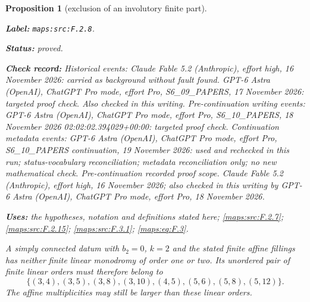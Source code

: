 \documentclass[11pt,a4paper]{article}
\newtheorem{proposition}[proposition]{Proposition}
\theoremstyle{definition}
\newcommand{\StatementRecord}[4]{\par\smallskip\begingroup\upshape\raggedright\noindent\textbf{Label:} \nolinkurl{#1}.\par\noindent\textbf{Status:} #2.\par\noindent\textbf{Check record:} #3.\par\noindent\textbf{Uses:} #4.\par\endgroup\smallskip}
\begin{document}
\begin{proposition}[exclusion of an involutory finite part]\label{maps:src:F.2.8}
\StatementRecord{maps:src:F.2.8}{proved}{Historical events: Claude Fable 5.2 (Anthropic), effort high, 16 November 2026: carried as background without fault found. GPT-6 Astra (OpenAI), ChatGPT Pro mode, effort Pro, S6\_09\_PAPERS, 17 November 2026: targeted proof check. Also checked in this writing. Pre-continuation writing events: GPT-6 Astra (OpenAI), ChatGPT Pro mode, effort Pro, S6\_10\_PAPERS, 18 November 2026 02:02:02.394029+00:00: targeted proof check. Continuation metadata events: GPT-6 Astra (OpenAI), ChatGPT Pro mode, effort Pro, S6\_10\_PAPERS continuation, 19 November 2026: used and rechecked in this run; status-vocabulary reconciliation; metadata reconciliation only; no new mathematical check. \emph{Pre-continuation recorded proof scope.} Claude Fable 5.2 (Anthropic), effort high, 16 November 2026; also checked in this writing by GPT-6 Astra (OpenAI), ChatGPT Pro mode, effort Pro, 18 November 2026}{the hypotheses, notation and definitions stated here; \cref{maps:src:F.2.7}; \cref{maps:src:F.2.15}; \cref{maps:src:F.3.1}; \cref{maps:eq:F.3}}


A simply connected datum with $b_2=0$, $k=2$ and the stated
finite affine fillings has neither finite linear
monodromy of order one or two.  Its unordered pair of finite
linear orders must therefore belong to
\[
 \{(3,4),(3,5),(3,8),(3,10),(4,5),
       (5,6),(5,8),(5,12)\}.
 \tag{F.28}\label{maps:eq:F.28}
\]
The affine multiplicities may still be larger than these
linear orders.

\end{proposition}
\end{document}
